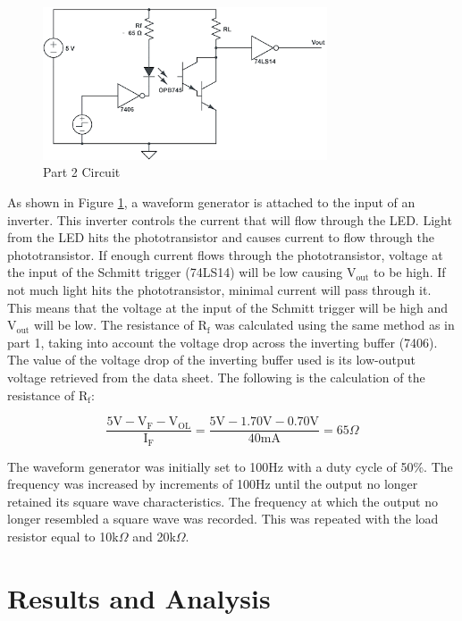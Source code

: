 \documentclass[CMPE]{KGCOEReport}
\begin{document}
\begin{figure}[H]
    \centering
    \includegraphics[width=0.75\textwidth]{circuit_2.png}
    \caption{Part 2 Circuit}
    \label{fig:circuit2}
\end{figure}

As shown in Figure \ref{fig:circuit2}, a waveform generator is attached to the input of an inverter. This inverter controls the current that will flow through the LED. Light from the LED hits the phototransistor and causes current to flow through the phototransistor. If enough current flows through the phototransistor, voltage at the input of the Schmitt trigger (74LS14) will be low causing V$_{\text{out}}$ to be high. If not much light hits the phototransistor, minimal current will pass through it. This means that the voltage at the input of the Schmitt trigger will be high and V$_{\text{out}}$ will be low. The resistance of R$_\text{f}$ was calculated using the same method as in part 1, taking into account the voltage drop across the inverting buffer (7406). The value of the voltage drop of the inverting buffer used is its low-output voltage retrieved from the data sheet. The following is the calculation of the resistance of R$_\text{f}$:

\[ \frac{5\text{V} - \text{V}_\text{F} - \text{V}_\text{OL}}{\text{I}_\text{F}} = \frac{5\text{V} - 1.70\text{V} - 0.70\text{V}}{40 \text{mA}} = 65 \Omega \]

The waveform generator was initially set to 100Hz with a duty cycle of 50\%. The frequency was increased by increments of 100Hz until the output no longer retained its square wave characteristics. The frequency at which the output no longer resembled a square wave was recorded. This was repeated with the load resistor equal to 10k$\Omega$ and 20k$\Omega$.

\section*{Results and Analysis}
\end{document}
